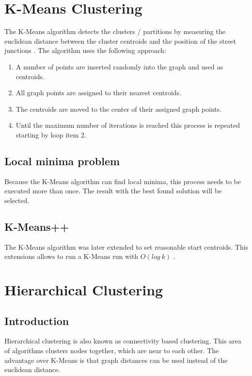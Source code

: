 \section{K-Means Clustering}
\label{sec:K-Means}
The K-Means algorithm detects the clusters / partitions by measuring the euclidean distance between the cluster centroids and the position of the street junctions \cite{k-means++:2007}. The algorithm uses the following approach:

\begin{enumerate}
    \item A number of points are inserted randomly into the graph and used as centroids.
    \item All graph points are assigned to their nearest centroids.
    \item The centroids are moved to the center of their assigned graph points.
    \item Until the maximum number of iterations is reached this process is repeated starting by loop item 2.
\end{enumerate}

\subsection{Local minima problem}
Because the K-Means algorithm can find local minima, this process needs to be executed more than once. The result with the best found solution will be selected.

\subsection{K-Means++}
The K-Means algorithm was later extended to set reasonable start centroids. This extensions allows to run a K-Means run with $O(log\ k)$ \cite{k-means++:2007}.

\pagebreak
\FloatBarrier
\section{Hierarchical Clustering} 
\label{sec:hierarchicalClustering}
\subsection{Introduction}
Hierarchical clustering is also known as connectivity based clustering. This area of algorithms clusters nodes together, which are near to each other. The advantage over K-Means is that graph distances can be used instead of the euclidean distance.

